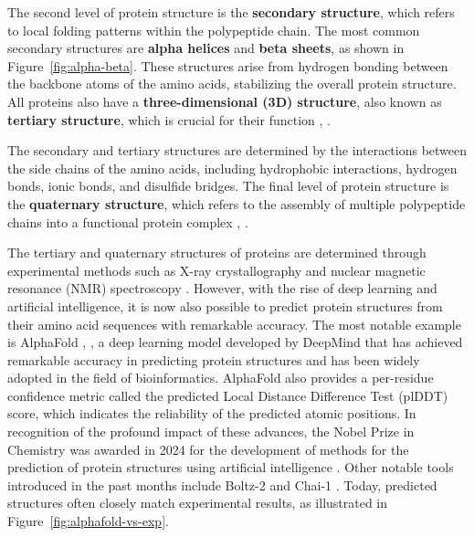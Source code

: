 The second level of protein structure is the \textbf{secondary structure}, which refers to local folding patterns within the polypeptide chain. The most common secondary structures are \textbf{alpha helices} and \textbf{beta sheets}, as shown in Figure~\ref{fig:alpha-beta}. These structures arise from hydrogen bonding between the backbone atoms of the amino acids, stabilizing the overall protein structure. All proteins also have a \textbf{three-dimensional (3D) structure}, also known as \textbf{tertiary structure}, which is crucial for their function \cite{nelson2008lehninger}, \cite{voet2010biochemistry}.

The secondary and tertiary structures are determined by the interactions between the side chains of the amino acids, including hydrophobic interactions, hydrogen bonds, ionic bonds, and disulfide bridges. The final level of protein structure is the \textbf{quaternary structure}, which refers to the assembly of multiple polypeptide chains into a functional protein complex \cite{nelson2008lehninger}, \cite{voet2010biochemistry}.

The tertiary and quaternary structures of proteins are determined through experimental methods such as X-ray crystallography and nuclear magnetic resonance (NMR) spectroscopy \cite{berman2000protein}. However, with the rise of deep learning and artificial intelligence, it is now also possible to predict protein structures from their amino acid sequences with remarkable accuracy. The most notable example is AlphaFold \cite{jumper2021highly}, \cite{abramson2024accurate}, a deep learning model developed by DeepMind that has achieved remarkable accuracy in predicting protein structures and has been widely adopted in the field of bioinformatics. AlphaFold also provides a per-residue confidence metric called the predicted Local Distance Difference Test (plDDT) score\footnotemark[1], which indicates the reliability of the predicted atomic positions. In recognition of the profound impact of these advances, the Nobel Prize in Chemistry was awarded in 2024 for the development of methods for the prediction of protein structures using artificial intelligence \cite{abriata2024nobel}. Other notable tools introduced in the past months include Boltz-2 \cite{passaro2025boltz2} and Chai-1 \cite{chai2024chai}. Today, predicted structures often closely match experimental results, as illustrated in Figure~\ref{fig:alphafold-vs-exp}.


